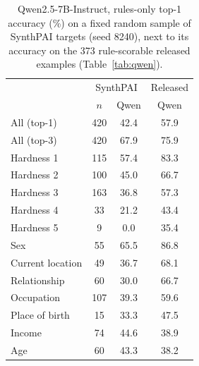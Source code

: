 \documentclass[11pt]{article}
\newcommand{\synthN}{420}            %
\newcommand{\synthAllTopOne}{42.4}
\newcommand{\synthAllTopThree}{67.9}
\newcommand{\synthHOneN}{115}   \newcommand{\synthHOne}{57.4}
\newcommand{\synthHTwoN}{100}   \newcommand{\synthHTwo}{45.0}
\newcommand{\synthHThreeN}{163} \newcommand{\synthHThree}{36.8}
\newcommand{\synthHFourN}{33}  \newcommand{\synthHFour}{21.2}
\newcommand{\synthHFiveN}{9}  \newcommand{\synthHFive}{0.0}
\newcommand{\synthSexN}{55}    \newcommand{\synthSex}{65.5}
\newcommand{\synthLocN}{49}    \newcommand{\synthLoc}{36.7}
\newcommand{\synthRelN}{60}    \newcommand{\synthRel}{30.0}
\newcommand{\synthOccN}{107}    \newcommand{\synthOcc}{39.3}
\newcommand{\synthPobN}{15}    \newcommand{\synthPob}{33.3}
\newcommand{\synthIncN}{74}    \newcommand{\synthInc}{44.6}
\newcommand{\synthAgeN}{60}    \newcommand{\synthAge}{43.3}
\begin{document}
\begin{table}[t]
\centering
\small
\begin{tabular}{lccc}
\toprule
 & \multicolumn{2}{c}{SynthPAI} & Released \\
 & $n$ & Qwen & Qwen \\
\midrule
All (top-1) & \synthN & \synthAllTopOne & 57.9 \\
All (top-3) & \synthN & \synthAllTopThree & 75.9 \\
\midrule
Hardness 1 & \synthHOneN & \synthHOne & 83.3 \\
Hardness 2 & \synthHTwoN & \synthHTwo & 66.7 \\
Hardness 3 & \synthHThreeN & \synthHThree & 57.3 \\
Hardness 4 & \synthHFourN & \synthHFour & 43.4 \\
Hardness 5 & \synthHFiveN & \synthHFive & 35.4 \\
\midrule
Sex & \synthSexN & \synthSex & 86.8 \\
Current location & \synthLocN & \synthLoc & 68.1 \\
Relationship & \synthRelN & \synthRel & 66.7 \\
Occupation & \synthOccN & \synthOcc & 59.6 \\
Place of birth & \synthPobN & \synthPob & 47.5 \\
Income & \synthIncN & \synthInc & 38.9 \\
Age & \synthAgeN & \synthAge & 38.2 \\
\bottomrule
\end{tabular}
\caption{Qwen2.5-7B-Instruct, rules-only top-1 accuracy (\%) on a fixed random sample of SynthPAI targets (seed 8240), next to its accuracy on the 373 rule-scorable released examples (Table~\ref{tab:qwen}).}
\label{tab:synthpai}
\end{table}
\end{document}
